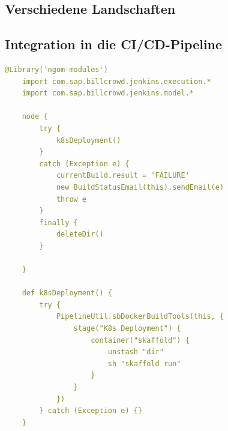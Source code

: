 \subsection{Verschiedene Landschaften}
\label{quellcode_verschiedene_landschaften}


\newpage


\newpage


\newpage

\newpage
\subsection{Integration in die \acs{CI}/\acs{CD}-Pipeline}

\newpage
\begin{lstlisting}[language=yaml, caption=Erweiterung Jenkinsfile um K8s Deployment Stage, label=quellcode_rater_jenkinsfile]
	@Library('ngom-modules')
	import com.sap.billcrowd.jenkins.execution.*
	import com.sap.billcrowd.jenkins.model.*
	
	node {
		try {
			k8sDeployment()
		} 
		catch (Exception e) {
			currentBuild.result = 'FAILURE'
			new BuildStatusEmail(this).sendEmail(e)
			throw e
		} 
		finally {
			deleteDir()
		}
	
	}
	
	def k8sDeployment() {
		try {
			PipelineUtil.sbDockerBuildTools(this, {
				stage("K8s Deployment") {
					container("skaffold") {
						unstash "dir"
						sh "skaffold run"
					}
				}
			})
		} catch (Exception e) {}
	}
\end{lstlisting}
\newpage
